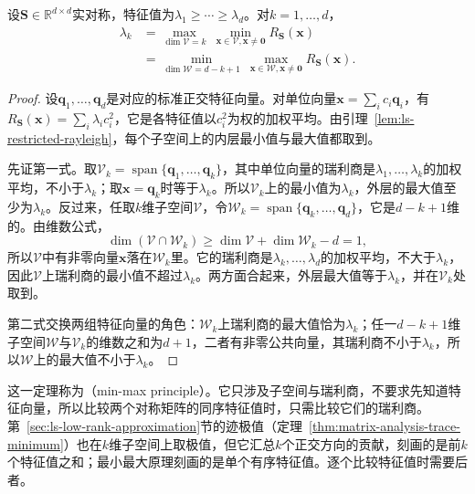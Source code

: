 \begin{theorem}
\label{thm:matrix-analysis-courant-fischer}
\label{eq:matrix-analysis-courant-fischer}
设$\bm S\in\mathbb R^{d\times d}$实对称，特征值为$\lambda_1\geq\cdots\geq\lambda_d$。对$k=1,\ldots,d$，
\begin{equation*}
\begin{aligned}
 \lambda_k
 &=\max_{\dim\mathcal V=k}\ \min_{\bm x\in\mathcal V,\bm x\neq\bm0}R_{\bm S}(\bm x)\\
 &=\min_{\dim\mathcal W=d-k+1}\ \max_{\bm x\in\mathcal W,\bm x\neq\bm0}R_{\bm S}(\bm x).
\end{aligned}
\end{equation*}
\end{theorem}
\begin{proof}
设$\bm q_1,\ldots,\bm q_d$是对应的标准正交特征向量。对单位向量$\bm x=\sum_ic_i\bm q_i$，有$R_{\bm S}(\bm x)=\sum_i\lambda_ic_i^2$，它是各特征值以$c_i^2$为权的加权平均。由引理~\ref{lem:ls-restricted-rayleigh}，每个子空间上的内层最小值与最大值都取到。

先证第一式。取$\mathcal V_k=\operatorname{span}\{\bm q_1,\ldots,\bm q_k\}$，其中单位向量的瑞利商是$\lambda_1,\ldots,\lambda_k$的加权平均，不小于$\lambda_k$；取$\bm x=\bm q_k$时等于$\lambda_k$。所以$\mathcal V_k$上的最小值为$\lambda_k$，外层的最大值至少为$\lambda_k$。反过来，任取$k$维子空间$\mathcal V$，令$\mathcal W_k=\operatorname{span}\{\bm q_k,\ldots,\bm q_d\}$，它是$d-k+1$维的。由维数公式，
\[
 \dim(\mathcal V\cap\mathcal W_k)\geq\dim\mathcal V+\dim\mathcal W_k-d=1,
\]
所以$\mathcal V$中有非零向量$\bm x$落在$\mathcal W_k$里。它的瑞利商是$\lambda_k,\ldots,\lambda_d$的加权平均，不大于$\lambda_k$，因此$\mathcal V$上瑞利商的最小值不超过$\lambda_k$。两方面合起来，外层最大值等于$\lambda_k$，并在$\mathcal V_k$处取到。

第二式交换两组特征向量的角色：$\mathcal W_k$上瑞利商的最大值恰为$\lambda_k$；任一$d-k+1$维子空间$\mathcal W$与$\mathcal V_k$的维数之和为$d+1$，二者有非零公共向量，其瑞利商不小于$\lambda_k$，所以$\mathcal W$上的最大值不小于$\lambda_k$。
\end{proof}
这一定理称为（min-max principle）。它只涉及子空间与瑞利商，不要求先知道特征向量，所以比较两个对称矩阵的同序特征值时，只需比较它们的瑞利商。第~\ref{sec:ls-low-rank-approximation}节的迹极值（定理~\ref{thm:matrix-analysis-trace-minimum}）也在$k$维子空间上取极值，但它汇总$k$个正交方向的贡献，刻画的是前$k$个特征值之和；最小最大原理刻画的是单个有序特征值。逐个比较特征值时需要后者。

